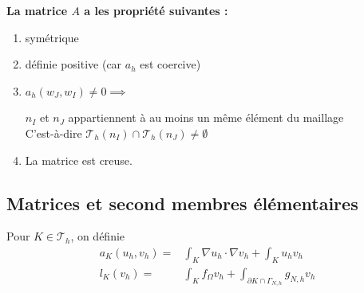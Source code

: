 \documentclass[12pt,a4paper]{article}
\begin{document}
{		\textbf{La matrice $A$ a les propriété suivantes :}
		\begin{enumerate}[label=$\star$]
			\item symétrique
			\item définie positive (car $a_h$ est coercive)
			\item $a_h(w_J,w_I) \not=0 \implies$ \begin{minipage}[t]{8cm}
				$n_I$ et $n_J$ appartiennent à au moins un même élément du maillage\\
				C'est-à-dire $\mathcal{T}_h(n_I)\cap\mathcal{T}_h(n_J) \not=\emptyset$
				\end{minipage}
			\item La matrice est creuse.
		\end{enumerate}
		}
		
		\newpage

		\subsection{Matrices et second membres élémentaires}
		
		\begin{defi}
			Pour $K \in \mathcal{T}_h$, on définie 
			\[\begin{aligned}
				a_K(u_h,v_h) =& \displaystyle\int_K \nabla u_h \cdot \nabla v_h + \int_K u_hv_h\\
				l_K(v_h) =& \int_K f_\Omega v_h + \int_{\partial K\cap \Gamma_{N,h}} g_{N,h}v_h
			\end{aligned}\]
		\end{defi}
		
\end{document}
